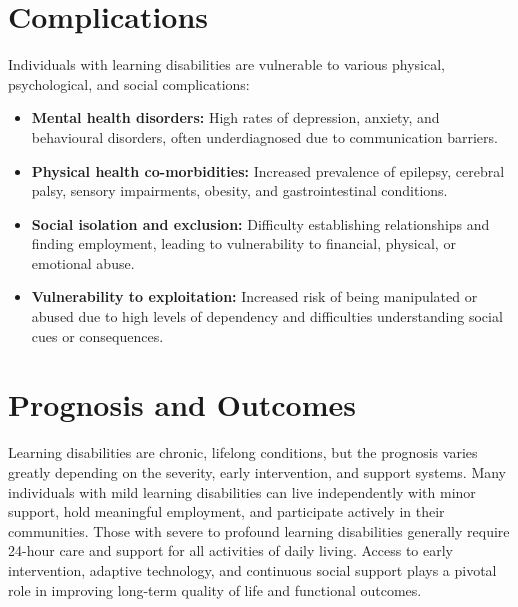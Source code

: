 \section*{Complications}
Individuals with learning disabilities are vulnerable to various physical, psychological, and social complications:
\begin{itemize}
    \item \textbf{Mental health disorders:} High rates of depression, anxiety, and behavioural disorders, often underdiagnosed due to communication barriers.
    \item \textbf{Physical health co-morbidities:} Increased prevalence of epilepsy, cerebral palsy, sensory impairments, obesity, and gastrointestinal conditions.
    \item \textbf{Social isolation and exclusion:} Difficulty establishing relationships and finding employment, leading to vulnerability to financial, physical, or emotional abuse.
    \item \textbf{Vulnerability to exploitation:} Increased risk of being manipulated or abused due to high levels of dependency and difficulties understanding social cues or consequences.
\end{itemize}

\section*{Prognosis and Outcomes}
Learning disabilities are chronic, lifelong conditions, but the prognosis varies greatly depending on the severity, early intervention, and support systems. Many individuals with mild learning disabilities can live independently with minor support, hold meaningful employment, and participate actively in their communities. Those with severe to profound learning disabilities generally require 24-hour care and support for all activities of daily living. Access to early intervention, adaptive technology, and continuous social support plays a pivotal role in improving long-term quality of life and functional outcomes.

